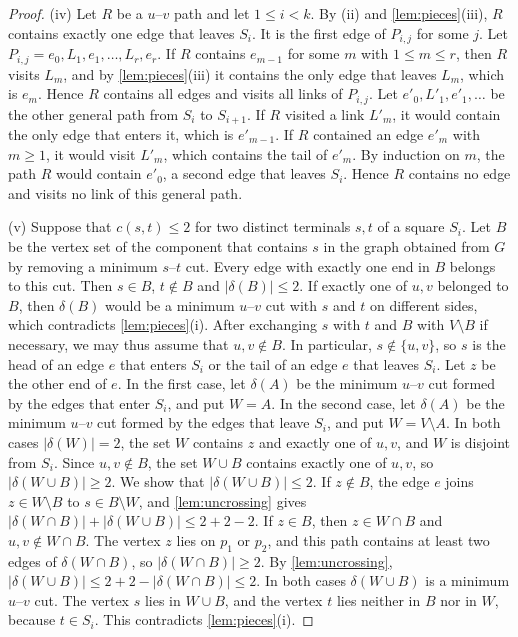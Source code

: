 \begin{proof}
(iv) Let $R$ be a $u$--$v$ path and let $1 \leq i < k$.
By (ii) and \cref{lem:pieces}(iii), $R$ contains exactly one edge that leaves $S_i$.
It is the first edge of $P_{i,j}$ for some $j$.
Let $P_{i,j} = e_0, L_1, e_1, \dots, L_r, e_r$.
If $R$ contains $e_{m-1}$ for some $m$ with $1 \leq m \leq r$, then $R$ visits $L_m$, and by \cref{lem:pieces}(iii) it contains the only edge that leaves $L_m$, which is $e_m$.
Hence $R$ contains all edges and visits all links of $P_{i,j}$.
Let $e'_0, L'_1, e'_1, \dots$ be the other general path from $S_i$ to $S_{i+1}$.
If $R$ visited a link $L'_m$, it would contain the only edge that enters it, which is $e'_{m-1}$.
If $R$ contained an edge $e'_m$ with $m \geq 1$, it would visit $L'_m$, which contains the tail of $e'_m$.
By induction on $m$, the path $R$ would contain $e'_0$, a second edge that leaves $S_i$.
Hence $R$ contains no edge and visits no link of this general path.

(v) Suppose that $c(s, t) \leq 2$ for two distinct terminals $s, t$ of a square $S_i$.
Let $B$ be the vertex set of the component that contains $s$ in the graph obtained from $G$ by removing a minimum $s$--$t$ cut.
Every edge with exactly one end in $B$ belongs to this cut.
Then $s \in B$, $t \notin B$ and $|\delta(B)| \leq 2$.
If exactly one of $u, v$ belonged to $B$, then $\delta(B)$ would be a minimum $u$--$v$ cut with $s$ and $t$ on different sides, which contradicts \cref{lem:pieces}(i).
After exchanging $s$ with $t$ and $B$ with $V \setminus B$ if necessary, we may thus assume that $u, v \notin B$.
In particular, $s \notin \{u, v\}$, so $s$ is the head of an edge $e$ that enters $S_i$ or the tail of an edge $e$ that leaves $S_i$.
Let $z$ be the other end of $e$.
In the first case, let $\delta(A)$ be the minimum $u$--$v$ cut formed by the edges that enter $S_i$, and put $W = A$.
In the second case, let $\delta(A)$ be the minimum $u$--$v$ cut formed by the edges that leave $S_i$, and put $W = V \setminus A$.
In both cases $|\delta(W)| = 2$, the set $W$ contains $z$ and exactly one of $u, v$, and $W$ is disjoint from $S_i$.
Since $u, v \notin B$, the set $W \cup B$ contains exactly one of $u, v$, so $|\delta(W \cup B)| \geq 2$.
We show that $|\delta(W \cup B)| \leq 2$.
If $z \notin B$, the edge $e$ joins $z \in W \setminus B$ to $s \in B \setminus W$, and \cref{lem:uncrossing} gives $|\delta(W \cap B)| + |\delta(W \cup B)| \leq 2 + 2 - 2$.
If $z \in B$, then $z \in W \cap B$ and $u, v \notin W \cap B$.
The vertex $z$ lies on $p_1$ or $p_2$, and this path contains at least two edges of $\delta(W \cap B)$, so $|\delta(W \cap B)| \geq 2$.
By \cref{lem:uncrossing}, $|\delta(W \cup B)| \leq 2 + 2 - |\delta(W \cap B)| \leq 2$.
In both cases $\delta(W \cup B)$ is a minimum $u$--$v$ cut.
The vertex $s$ lies in $W \cup B$, and the vertex $t$ lies neither in $B$ nor in $W$, because $t \in S_i$.
This contradicts \cref{lem:pieces}(i).
\end{proof}

